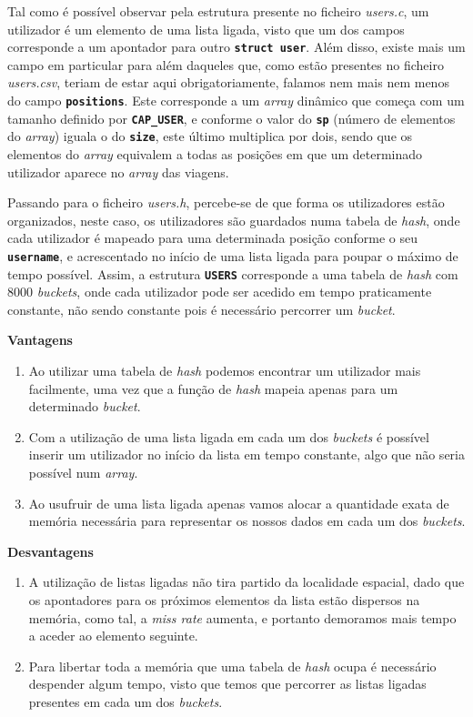 \documentclass[12pt,a4paper]{report}
\begin{document}
Tal como é possível observar pela estrutura presente no ficheiro \textit{users.c}, um utilizador é um elemento de uma lista ligada, visto que um dos campos corresponde a um apontador para outro \texttt{\small\textbf{struct user}}. Além disso, existe mais um campo em particular para além daqueles que, como estão presentes no ficheiro \textit{users.csv}, teriam de estar aqui obrigatoriamente, falamos nem mais nem menos do campo \texttt{\small\textbf{positions}}. Este corresponde a um \textit{array} dinâmico que começa com um tamanho definido por \textbf{\small\texttt{CAP\_USER}}, e conforme o valor do \textbf{\small\texttt{sp}} (número de elementos do \textit{array}) iguala o do \textbf{\small\texttt{size}}, este último multiplica por dois, sendo que os elementos do \textit{array} equivalem a todas as posições em que um determinado utilizador aparece no \textit{array} das viagens.

Passando para o ficheiro \textit{users.h}, percebe-se de que forma os utilizadores estão organizados, neste caso, os utilizadores são guardados numa tabela de \textit{hash}, onde cada utilizador é mapeado para uma determinada posição conforme o seu \texttt{\small\textbf{username}}, e acrescentado no início de uma lista ligada para poupar o máximo de tempo possível. Assim, a estrutura \texttt{\small\textbf{USERS}} corresponde a uma tabela de \textit{hash} com 8000 \textit{buckets}, onde cada utilizador pode ser acedido em tempo praticamente constante, não sendo constante pois é necessário percorrer um \textit{bucket}.


\normalsize\textbf{Vantagens}
    \begin{enumerate}
        \item Ao utilizar uma tabela de \textit{hash} podemos encontrar um utilizador mais facilmente, uma vez que a função de \textit{hash} mapeia apenas para um determinado \textit{bucket}.

        \item Com a utilização de uma lista ligada em cada um dos \textit{buckets} é possível inserir um utilizador no início da lista em tempo constante, algo que não seria possível num \textit{array}.
        
        \item Ao usufruir de uma lista ligada apenas vamos alocar a quantidade exata de memória necessária para representar os nossos dados em cada um dos \textit{buckets}. 
    \end{enumerate}

\normalsize\textbf{Desvantagens}
    \begin{enumerate}
        \item A utilização de listas ligadas não tira partido da localidade espacial, dado que os apontadores para os próximos elementos da lista estão dispersos na memória, como tal, a \textit{miss rate} aumenta, e portanto demoramos mais tempo a aceder ao elemento seguinte.
        
        \item Para libertar toda a memória que uma tabela de \textit{hash} ocupa é necessário despender algum tempo, visto que temos que percorrer as listas ligadas presentes em cada um dos \textit{buckets}.
    \end{enumerate}
\end{document}
